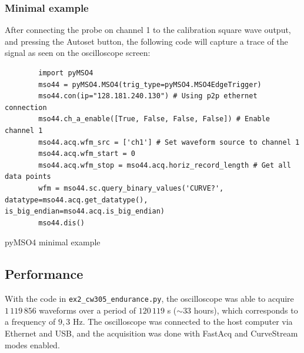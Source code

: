 \documentclass[a4paper,english,twoside,10pt]{article}
\begin{document}
\subsubsection{Minimal example}
After connecting the probe on channel 1 to the calibration square wave output, and pressing the Autoset button, the following code will capture a trace of the signal as seen on the oscilloscope screen:
\begin{flushleft}
	\captionsetup{type=listing}
	\begin{verbatim}
		import pyMSO4
		mso44 = pyMSO4.MSO4(trig_type=pyMSO4.MSO4EdgeTrigger)
		mso44.con(ip="128.181.240.130") # Using p2p ethernet connection
		mso44.ch_a_enable([True, False, False, False]) # Enable channel 1
		mso44.acq.wfm_src = ['ch1'] # Set waveform source to channel 1
		mso44.acq.wfm_start = 0
		mso44.acq.wfm_stop = mso44.acq.horiz_record_length # Get all data points
		wfm = mso44.sc.query_binary_values('CURVE?', datatype=mso44.acq.get_datatype(), is_big_endian=mso44.acq.is_big_endian)
		mso44.dis()
	\end{verbatim}
	\caption{pyMSO4 minimal example}
\end{flushleft}

\subsection{Performance}
With the code in \texttt{ex2\_cw305\_endurance.py}, the oscilloscope was able to acquire \(1\,119\,856\) waveforms over a period of \(120\,119\) s (\(\sim33\) hours), which corresponds to a frequency of \(9,3\) Hz. The oscilloscope was connected to the host computer via Ethernet and USB, and the acquisition was done with FastAcq and CurveStream modes enabled.
\end{document}
